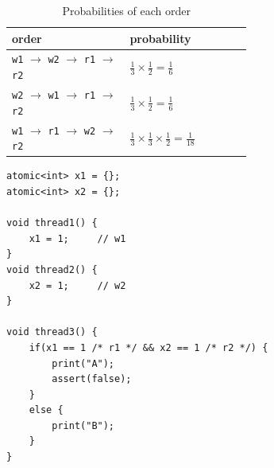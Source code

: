 \begin{table}[h]
    \centering
    \renewcommand{\arraystretch}{1.5} %
    \begin{tabular}{|p{0.3\linewidth}|p{0.3\linewidth}|}    
        \hline
        order & probability  \\ \hline
        \texttt{w1} $\rightarrow$ \texttt{w2} $\rightarrow$ \texttt{r1} $\rightarrow$ \texttt{r2}  & $\frac{1}{3} \times \frac{1}{2} = \frac{1}{6}$ \\  
        \texttt{w2} $\rightarrow$ \texttt{w1} $\rightarrow$ \texttt{r1} $\rightarrow$ \texttt{r2} & $\frac{1}{3} \times \frac{1}{2} = \frac{1}{6}$ \\  
        \texttt{w1} $\rightarrow$ \texttt{r1} $\rightarrow$ \texttt{w2} $\rightarrow$ \texttt{r2} & $\frac{1}{3} \times \frac{1}{3} \times \frac{1}{2} = \frac{1}{18}$    \\ 
        \hline
    \end{tabular}
    \caption{Probabilities of each order}
    \label{tab:order-prob}
\end{table}

\begin{lstlisting}[caption={P2}, label={P2}]
atomic<int> x1 = {};
atomic<int> x2 = {};

void thread1() {
    x1 = 1;     // w1 
}
void thread2() {
    x2 = 1;     // w2
}

void thread3() {
    if(x1 == 1 /* r1 */ && x2 == 1 /* r2 */) {    
        print("A");
        assert(false);
    }
    else {
        print("B");        
    }
}
\end{lstlisting}



